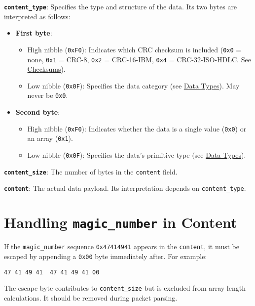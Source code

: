 \documentclass[a4paper]{article}
\begin{document}
\textbf{\texttt{content\_type}}: Specifies the type and structure of the data. Its two bytes are interpreted as follows:
\begin{itemize}
  \item \textbf{First byte}:
  \begin{itemize}
    \item High nibble (\texttt{0xF0}): Indicates which CRC checksum is included (\texttt{0x0} = none, \texttt{0x1} = CRC-8, \texttt{0x2} = CRC-16-IBM, \texttt{0x4} = CRC-32-ISO-HDLC. See \hyperref[checksums]{Checksums}).
    \item Low nibble (\texttt{0x0F}): Specifies the data category  (see \hyperref[data-types]{Data Types}). May never be \texttt{0x0}.
  \end{itemize}
  \item \textbf{Second byte}:
  \begin{itemize}
    \item High nibble (\texttt{0xF0}): Indicates whether the data is a single value (\texttt{0x0}) or an array (\texttt{0x1}).
    \item Low nibble (\texttt{0x0F}): Specifies the data's primitive type (see \hyperref[data-types]{Data Types}).
  \end{itemize}
\end{itemize}

\textbf{\texttt{content\_size}}: The number of bytes in the \texttt{content} field.

\textbf{\texttt{content}}: The actual data payload. Its interpretation depends on \texttt{content\_type}.

\section{Handling \texttt{magic\_number} in Content}
If the \texttt{magic\_number} sequence \texttt{0x47414941} appears in the \texttt{content}, it must be escaped by appending a \texttt{0x00} byte immediately after. For example:

\texttt{47 41 49 41 }\textrightarrow\texttt{ 47 41 49 41 00}

The escape byte contributes to \texttt{content\_size} but is excluded from array length calculations. It should be removed during packet parsing.
\end{document}
